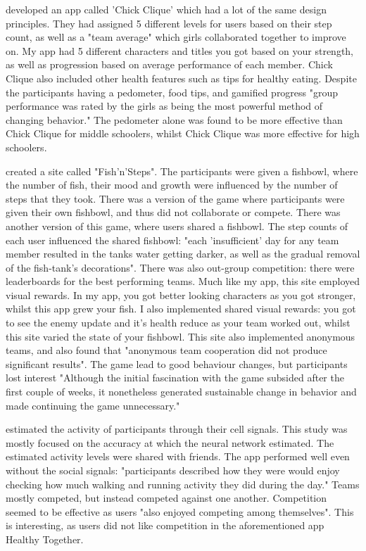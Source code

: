 \documentclass{l4proj}
\begin{document}
\citet{ChickClique} developed an app called 'Chick Clique' which had a lot of the same design principles. They had assigned 5 different levels for users based on their step count, as well as a "team average" which girls collaborated together to improve on. My app had 5 different characters and titles you got based on your strength, as well as progression based on average performance of each member. Chick Clique also included other health features such as tips for healthy eating. Despite the participants having a pedometer, food tips, and gamified progress "group performance was rated by the girls as being the most powerful method of changing behavior." The pedometer alone was found to be more effective than Chick Clique for middle schoolers, whilst Chick Clique was more effective for high schoolers.

\citet{Fish'n'Steps} created a site called "Fish'n'Steps". The participants were given a fishbowl, where the number of fish, their mood and growth were influenced by the number of steps that they took. There was a version of the game where participants were given their own fishbowl, and thus did not collaborate or compete. There was another version of this game, where users shared a fishbowl. The step counts of each user influenced the shared fishbowl: "each 'insufficient' day for any team member resulted in the tanks water getting darker, as well as the gradual removal of the fish-tank’s decorations". There was also out-group competition: there were leaderboards for the best performing teams. Much like my app, this site employed visual rewards. In my app, you got better looking characters as you got stronger, whilst this app grew your fish. I also implemented shared visual rewards: you got to see the enemy update and it's health reduce as your team worked out, whilst this site varied the state of your fishbowl. This site also implemented anonymous teams, and also found that "anonymous team cooperation did not produce significant results".  The game lead to good behaviour changes, but participants lost interest "Although the initial fascination with the game subsided after the first couple of weeks, it nonetheless generated sustainable change in behavior and made continuing the game unnecessary."

\citet{Shakra} estimated the activity of participants through their cell signals. This study was mostly focused on the accuracy at which the neural network estimated. The estimated activity levels were shared with friends. The app performed well even without the social signals: "participants described how they were would enjoy checking how much walking and running activity they did during the day." Teams mostly competed, but instead competed against one another. Competition seemed to be effective as users "also enjoyed competing among themselves". This is interesting, as users did not like competition in the aforementioned app Healthy Together. 
\end{document}
